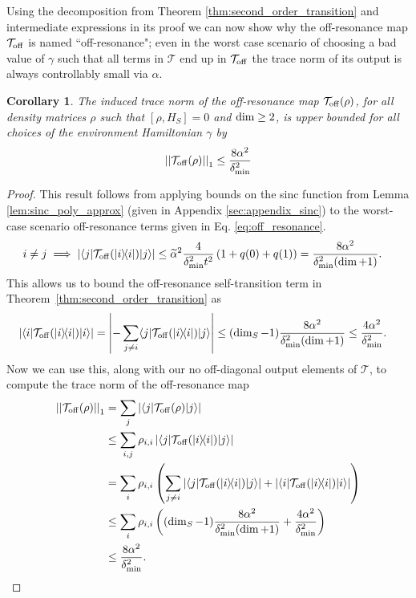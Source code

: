 \documentclass{article}
\newtheorem{corollary}[theorem]{Corollary}
\newcommand{\off}{\rm off}
\newcommand{\ket}[1]{|#1\rangle}
\newcommand{\bra}[1]{\langle #1|}
\newcommand{\ketbra}[2]{| #1\rangle\! \langle #2|}
\newcommand{\abs}[1]{\left| #1 \right|}
\newcommand{\norm}[1]{\left|\left| #1 \right|\right|}
\begin{document}
Using the decomposition from Theorem \ref{thm:second_order_transition} and intermediate expressions in its proof we can now show why the off-resonance map $\mathcal{T}_{\off}$ is named ``off-resonance"; even in the worst case scenario of choosing a bad value of $\gamma$ such that all terms in $\mathcal{T}$ end up in $\mathcal{T}_{\off}$ the trace norm of its output is always controllably small via $\alpha$.
\begin{corollary} \label{cor:t_off_norm}
    The induced trace norm of the off-resonance map $\mathcal{T}_{\off}(\rho)$, for all density matrices $\rho$ such that $[\rho, H_S] = 0$ and $\rm{dim}\ge 2$, is upper bounded for all choices of the environment Hamiltonian $\gamma$ by
    \begin{align}
        \norm{\mathcal{T}_{\off}(\rho)}_1 \le \frac{8 \alpha^2}{\delta_{\min}^2}
    \end{align}
\end{corollary}
\begin{proof}
This result follows from applying bounds on the sinc function from Lemma \ref{lem:sinc_poly_approx} (given in Appendix \ref{sec:appendix_sinc}) to the worst-case scenario off-resonance terms given in Eq. \eqref{eq:off_resonance}. 
    \begin{align}
        i \neq j \implies \abs{\bra{j}\mathcal{T}_{\off}(\ketbra{i}{i})\ket{j}} &\le \widetilde{\alpha}^2\frac{4}{\delta_{\min}^2 t^2} \left( 1 + q(0) + q(1)\right) = \frac{8 \alpha^2}{\delta_{\min}^2(\dim + 1)}.
    \end{align}
    This allows us to bound the off-resonance self-transition term in Theorem~\ref{thm:second_order_transition} as
    \begin{align}
        \abs{\bra{i}\mathcal{T}_{\off}(\ketbra{i}{i})\ket{i}} &= \abs{- \sum_{j \neq i} \bra{j} \mathcal{T}_{\off}(\ketbra{i}{i}) \ket{j}} \le (\dim_S - 1) \frac{8 \alpha^2}{\delta_{\min}^2 (\dim + 1)} \le \frac{4 \alpha^2}{\delta_{\min}^2}.
    \end{align}
    Now we can use this, along with our no off-diagonal output elements of $\mathcal{T}$, to compute the trace norm of the off-resonance map
    \begin{align}
        \norm{\mathcal{T}_{\off}(\rho)}_1 &= \sum_{j} \abs{\bra{j} \mathcal{T}_{\off}(\rho) \ket{j}} \\
        &\le \sum_{i, j} \rho_{i,i} \abs{\bra{j}\mathcal{T}_{\off}(\ketbra{i}{i})\ket{j}} \\
        &= \sum_{i} \rho_{i,i} \left(\sum_{j \neq i} |\bra{j} \mathcal{T}_{\off}(\ketbra{i}{i}) \ket{j}| + |\bra{i} \mathcal{T}_{\off}(\ketbra{i}{i})\ket{i}| \right) \\
        &\le \sum_{i} \rho_{i,i} \left( (\dim_S - 1) \frac{8 \alpha^2}{\delta_{\min}^2(\dim + 1)} + \frac{4 \alpha^2}{\delta_{\min}^2} \right) \\
        &\le \frac{8 \alpha^2}{\delta_{\min}^2}.
    \end{align}
\end{proof}
\end{document}
